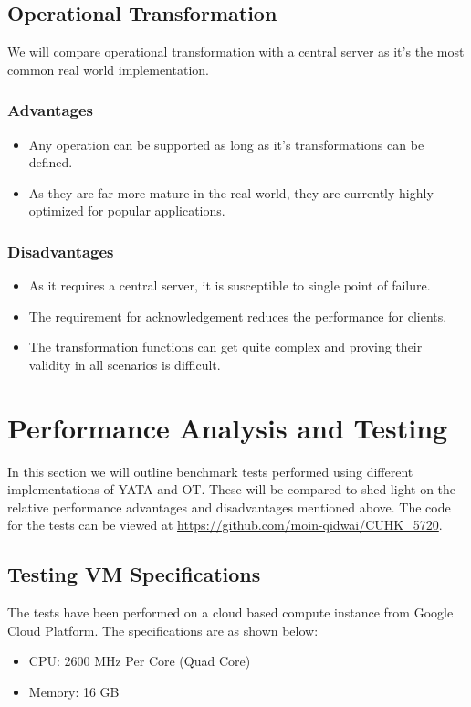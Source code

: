 \documentclass[9pt, titlepage]{article}
\begin{document}
  \subsection{Operational Transformation}
  We will compare operational transformation with a central server as it's the most common real world implementation.

  \subsubsection{Advantages}
  \begin{itemize}
    \item Any operation can be supported as long as it's transformations can be defined.
    \item As they are far more mature in the real world, they are currently highly optimized for popular applications.
  \end{itemize}

  \subsubsection{Disadvantages}
  \begin{itemize}
    \item As it requires a central server, it is susceptible to single point of failure.
    \item The requirement for acknowledgement reduces the performance for clients.
    \item The transformation functions can get quite complex and proving their validity in all scenarios is difficult.
  \end{itemize}

  \section{Performance Analysis and Testing}
  In this section we will outline benchmark tests performed using different implementations of YATA and OT.
  These will be compared to shed light on the relative performance advantages and disadvantages mentioned above.
  The code for the tests can be viewed at \url{https://github.com/moin-qidwai/CUHK_5720}.
  
  \subsection{Testing VM Specifications}
  The tests have been performed on a cloud based compute instance from Google Cloud Platform.
  The specifications are as shown below:
  \begin{itemize}
    \item CPU: 2600 MHz Per Core (Quad Core)
    \item Memory: 16 GB
  \end{itemize}
\end{document}
